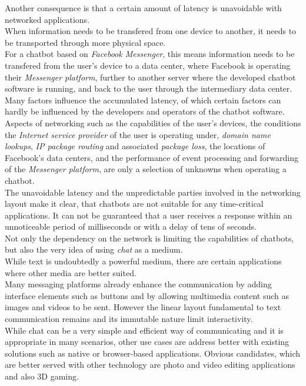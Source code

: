 Another consequence is that a certain amount of latency is unavoidable with networked applications.
\\
When information needs to be transfered from one device to another,
it needs to be transported through more physical space.
\\
For a chatbot based on \emph{Facebook Messenger},
this means information needs to be transfered from the user's device to a data center,
where Facebook is operating their \emph{Messenger platform},
further to another server where the developed chatbot software is running,
and back to the user through the intermediary data center.
\\
Many factors influence the accumulated latency,
of which certain factors can hardly be influenced by the developers and operators of the chatbot software.
\\
Aspects of networking such as the capabilities of the user's devices,
the conditions the \emph{Internet service provider} of the user is operating under,
\emph{domain name lookups},
\emph{IP package routing} and associated \emph{package loss},
the locations of Facebook's data centers,
and the performance of event processing and forwarding of the \emph{Messenger platform},
are only a selection of unknowns when operating a chatbot.
\\
The unavoidable latency and the unpredictable parties involved in the networking layout
make it clear, that chatbots are not suitable for any time-critical applications.
It can not be guaranteed that a user receives a response within an unnoticeable period of milliseconds or with a delay of tens of seconds.
\\

Not only the dependency on the network is limiting the capabilities of chatbots,
but also the very idea of using \emph{chat} as a medium.
\\
While text is undoubtedly a powerful medium,
there are certain applications where other media are better suited.
\\
Many messaging platforms already enhance the communication by adding interface elements such as buttons
and by allowing multimedia content such as images and videos to be sent.
However the linear layout fundamental to text communication remains and its immutable nature limit interactivity.
\\
While chat can be a very simple and efficient way of communicating and it is appropriate in many scenarios,
other use cases are address better with existing solutions such as native or browser-based applications.
Obvious candidates, which are better served with other technology are photo and video editing applications
and also 3D gaming.
\\

